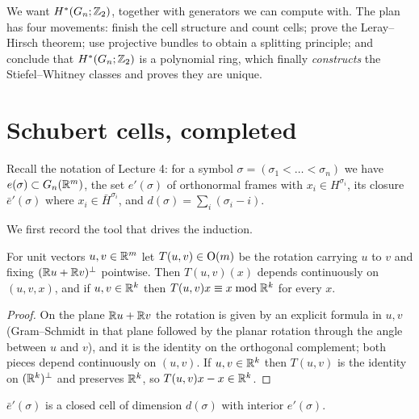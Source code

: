 \lecture

\begin{guiding}
We want $H^*(G_n;\mathbb{Z}_2)$, together with generators we can compute with. The plan
has four movements: finish the cell structure and count cells; prove the
Leray--Hirsch theorem; use projective bundles to obtain a splitting principle;
and conclude that $H^*(G_n;\mathbb{Z}_2)$ is a polynomial ring, which finally
\emph{constructs} the Stiefel--Whitney classes and proves they are unique.
\end{guiding}

\section{Schubert cells, completed}

Recall the notation of Lecture 4: for a symbol
$\sigma=(\sigma_1<\dots<\sigma_n)$ we have $e(\sigma)\subset G_n(\mathbb{R}^m)$, the set
$e'(\sigma)$ of orthonormal frames with $x_i\in H^{\sigma_i}$, its closure
$\bar e'(\sigma)$ where $x_i\in\bar H^{\sigma_i}$, and
$d(\sigma)=\sum_i(\sigma_i-i)$.

We first record the tool that drives the induction.

\begin{lemma}\label{lem:rotation}
For unit vectors $u,v\in\mathbb{R}^m$ let $T(u,v)\in\operatorname{O}(m)$ be the rotation carrying $u$
to $v$ and fixing $(\mathbb{R} u+\mathbb{R} v)^\perp$ pointwise. Then $T(u,v)(x)$ depends
continuously on $(u,v,x)$, and if $u,v\in\mathbb{R}^k$ then
$T(u,v)x\equiv x \bmod \mathbb{R}^k$ for every $x$.
\end{lemma}

\begin{proof}
On the plane $\mathbb{R} u+\mathbb{R} v$ the rotation is given by an explicit formula in $u,v$
(Gram--Schmidt in that plane followed by the planar rotation through the angle
between $u$ and $v$), and it is the identity on the orthogonal complement; both
pieces depend continuously on $(u,v)$. If $u,v\in\mathbb{R}^k$ then $T(u,v)$ is the
identity on $(\mathbb{R}^k)^\perp$ and preserves $\mathbb{R}^k$, so $T(u,v)x-x\in\mathbb{R}^k$.
\end{proof}

\begin{lemma}\label{lem:closed-cell}
$\bar e'(\sigma)$ is a closed cell of dimension $d(\sigma)$ with interior
$e'(\sigma)$.
\end{lemma}

